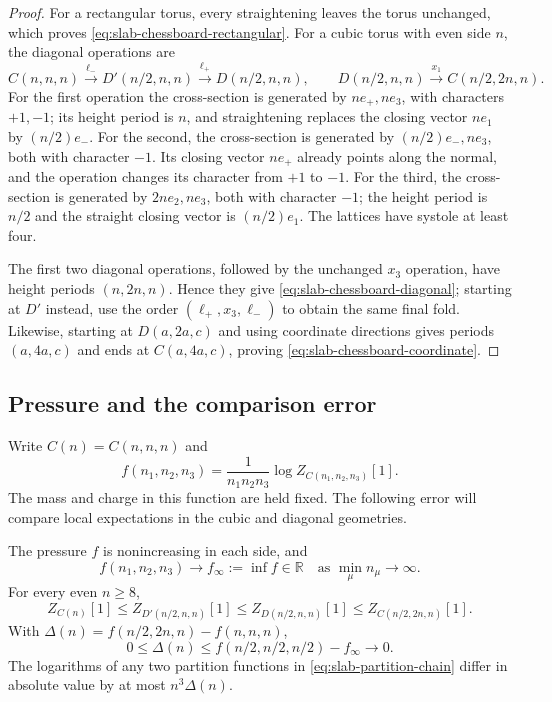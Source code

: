 \documentclass[11pt,letterpaper,reqno]{amsart}
\newcommand{\R}{\mathbb R}
\begin{document}
\begin{proof}
For a rectangular torus, every straightening leaves the torus unchanged,
which proves \eqref{eq:slab-chessboard-rectangular}. For a cubic torus
with even side $n$, the diagonal operations are
\begin{equation}\label{eq:slab-three-untwistings}
 C(n,n,n)\xrightarrow{\ell_-}D'(n/2,n,n)
          \xrightarrow{\ell_+}D(n/2,n,n),
 \qquad D(n/2,n,n)\xrightarrow{x_1}C(n/2,2n,n).
\end{equation}
For the first operation the cross-section is generated by $ne_+,ne_3$,
with characters $+1,-1$; its height period is $n$, and straightening
replaces the closing vector $ne_1$ by $(n/2)e_-$. For the second, the
cross-section is generated by $(n/2)e_-,ne_3$, both with character
$-1$. Its closing vector $ne_+$ already points along the normal,
and the operation changes its character from $+1$ to $-1$. For the
third, the cross-section is generated by $2ne_2,ne_3$, both with
character $-1$; the height period is $n/2$ and the straight closing
vector is $(n/2)e_1$. The lattices have systole at least four.

The first two diagonal operations, followed by the unchanged $x_3$
operation, have height periods $(n,2n,n)$. Hence they give
\eqref{eq:slab-chessboard-diagonal}; starting at $D'$ instead, use
the order $(\ell_+,x_3,\ell_-)$ to obtain the same final fold.
Likewise, starting at $D(a,2a,c)$ and using coordinate directions
gives periods $(a,4a,c)$ and ends at $C(a,4a,c)$, proving
\eqref{eq:slab-chessboard-coordinate}.
\end{proof}

\subsection{Pressure and the comparison error}\label{subsec:slab-pressure}

Write $C(n)=C(n,n,n)$ and
\[
 f(n_1,n_2,n_3)=\frac1{n_1n_2n_3}\log Z_{C(n_1,n_2,n_3)}[1].
\]
The mass and charge in this function are held fixed. The following
error will compare local expectations in the cubic and diagonal
geometries.

\begin{proposition}\label{prop:slab-pressure}
The pressure $f$ is nonincreasing in each side, and
\[
 f(n_1,n_2,n_3)\longrightarrow f_\infty:=\inf f\in\R
                     \quad\text{as }\min_\mu n_\mu\longrightarrow\infty.
\]
For every even $n\ge8$,
\begin{equation}\label{eq:slab-partition-chain}
 Z_{C(n)}[1]\le Z_{D'(n/2,n,n)}[1]
       \le Z_{D(n/2,n,n)}[1]\le Z_{C(n/2,2n,n)}[1].
\end{equation}
With $\Delta(n)=f(n/2,2n,n)-f(n,n,n)$,
\begin{equation}\label{eq:slab-pressure-error}
 0\le\Delta(n)\le f(n/2,n/2,n/2)-f_\infty\longrightarrow0.
\end{equation}
The logarithms of any two partition functions in
\eqref{eq:slab-partition-chain} differ in absolute value by at most
$n^3\Delta(n)$.
\end{proposition}
\end{document}
